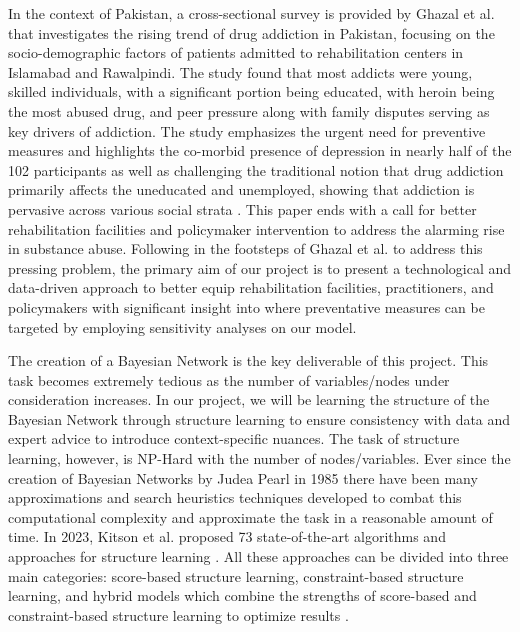 \documentclass[conference]{IEEEtran}
\begin{document}
In the context of Pakistan, a cross-sectional survey is provided by Ghazal et al. that investigates the rising trend of drug addiction in Pakistan, focusing on the socio-demographic factors of patients admitted to rehabilitation centers in Islamabad and Rawalpindi. The study found that most addicts were young, skilled individuals, with a significant portion being educated, with heroin being the most abused drug, and peer pressure along with family disputes serving as key drivers of addiction. The study emphasizes the urgent need for preventive measures and highlights the co-morbid presence of depression in nearly half of the 102 participants as well as challenging the traditional notion that drug addiction primarily affects the uneducated and unemployed, showing that addiction is pervasive across various social strata \cite{ghazal_substance_abuse_pakistan}. This paper ends with a call for better rehabilitation facilities and policymaker intervention to address the alarming rise in substance abuse. Following in the footsteps of Ghazal et al. to address this pressing problem, the primary aim of our project is to present a technological and data-driven approach to better equip rehabilitation facilities, practitioners, and policymakers with significant insight into where preventative measures can be targeted by employing sensitivity analyses on our model.

The creation of a Bayesian Network is the key deliverable of this project. This task becomes extremely tedious as the number of variables/nodes under consideration increases. In our project, we will be learning the structure of the Bayesian Network through structure learning to ensure consistency with data and expert advice to introduce context-specific nuances. The task of structure learning, however, is NP-Hard with the number of nodes/variables. Ever since the creation of Bayesian Networks by Judea Pearl in 1985 there have been many approximations and search heuristics techniques developed to combat this computational complexity and approximate the task in a reasonable amount of time. In 2023, Kitson et al. proposed 73 state-of-the-art algorithms and approaches for structure learning \cite{kitson2023survey}. All these approaches can be divided into three main categories: score-based structure learning, constraint-based structure learning, and hybrid models which combine the strengths of score-based and constraint-based structure learning to optimize results \cite{kitson2023survey}. 
\end{document}

